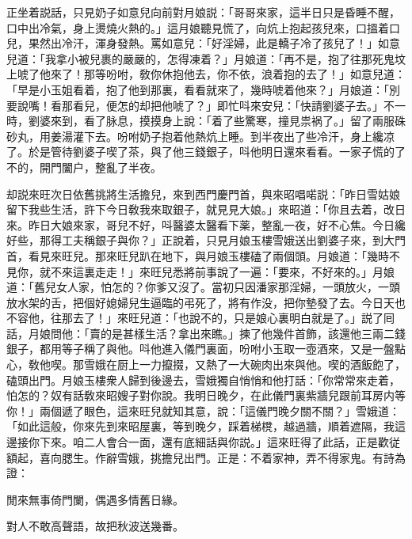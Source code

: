 正坐着説話，只見奶子如意兒向前對月娘説：「哥哥來家，這半日只是昏睡不醒，口中出冷氣，身上燙燒火熱的。」這月娘聽見慌了，向炕上抱起孩兒來，口搵着口兒，果然出冷汗，渾身發熱。罵如意兒：「好淫婦，此是轎子冷了孩兒了！」如意兒道：「我拿小被兒裹的嚴嚴的，怎得凍着？」月娘道：「再不是，抱了往那死鬼坟上唬了他來了！那等吩咐，敎你休抱他去，你不依，浪着抱的去了！」如意兒道：「早是小玉姐看着，抱了他到那裏，看看就來了，幾時唬着他來？」月娘道：「別要說嘴！看那看兒，便怎的却把他唬了？」即忙呌來安兒：「快請劉婆子去。」不一時，劉婆來到，看了脉息，摸摸身上說：「着了些驚寒，撞見祟祸了。」留了兩服硃砂丸，用姜湯灌下去。吩咐奶子抱着他熱炕上睡。到半夜出了些冷汗，身上纔凉了。於是管待劉婆子喫了茶，與了他三錢銀子，呌他明日還來看看。一家子慌的了不的，開門闔户，整亂了半夜。

却説來旺次日依舊挑將生活擔兒，來到西門慶門首，與來昭唱喏説：「昨日雪姑娘留下我些生活，許下今日敎我來取銀子，就見見大娘。」來昭道：「你且去着，改日來。昨日大娘來家，哥兒不好，呌醫婆太醫看下薬，整亂一夜，好不心焦。今日纔好些，那得工夫稱銀子與你？」正說着，只見月娘玉樓雪娥送出劉婆子來，到大門首，看見來旺兒。那來旺兒趴在地下，與月娘玉樓磕了兩個頭。月娘道：「幾時不見你，就不來這裏走走！」來旺兒悉將前事說了一遍：「要來，不好來的。」月娘道：「舊兒女人家，怕怎的？你爹又沒了。當初只因潘家那淫婦，一頭放火，一頭放水架的舌，把個好媳婦兒生逼臨的弔死了，將有作没，把你墊發了去。今日天也不容他，往那去了！」來旺兒道：「也說不的，只是娘心裏明白就是了。」説了囘話，月娘問他：「賣的是甚樣生活？拿出來瞧。」揀了他幾件首飾，該還他三兩二錢銀子，都用等子稱了與他。呌他進入儀門裏面，吩咐小玉取一壺酒來，又是一盤點心，敎他喫。那雪娥在厨上一力攛掇，又熱了一大碗肉出來與他。喫的酒飯飽了，磕頭出門。月娘玉樓衆人歸到後邊去，雪娥獨自悄悄和他打話：「你常常來走着，怕怎的？奴有話敎來昭嫂子對你說。我明日晚夕，在此儀門裏紫牆兒跟前耳房内等你！」兩個遞了眼色，這來旺兒就知其意，說：「這儀門晚夕關不關？」雪娥道：「如此這般，你來先到來昭屋裏，等到晚夕，踩着梯櫈，越過牆，順着遮隔，我這邊接你下來。咱二人會合一面，還有底細話與你説。」這來旺得了此話，正是歡従額起，喜向腮生。作辭雪娥，挑擔兒出門。正是：不着家神，弄不得家鬼。有詩為證：

閒來無事倚門闌，偶遇多情舊日緣。

對人不敢高聲語，故把秋波送幾番。

